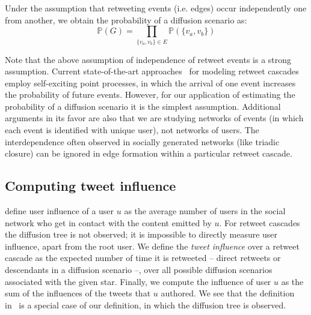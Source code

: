 Under the assumption that retweeting events (i.e. edges) occur independently one from another, we obtain the probability of a diffusion scenario as:
%
\begin{equation} \label{eq:prob-scenario}
	\mathds{P}(G) = \prod_{\{v_a,v_b\} \in E} \mathds{P}(\{v_a, v_b\})
\end{equation}

Note that the above assumption of independence of retweet events is a strong assumption.
Current state-of-the-art approaches~\cite{Mishra2016,Zhao2015} for modeling retweet cascades employ self-exciting point processes, in which the arrival of one event increases the probability of future events.
However, for our application of estimating the probability of a diffusion scenario it is the simplest assumption.
Additional arguments in its favor are also that we are studying networks of events
(in which each event is identified with unique user), not networks of users. 
The interdependence often observed in socially generated networks (like triadic closure)
can be ignored in edge formation within a particular retweet cascade. 

\subsection{Computing tweet influence}
\label{subsec:user-influence}

\cite{Du2013} define user influence of a user $u$ as the average number of users in the social network who get in contact with the content emitted by $u$.
For retweet cascades the diffusion tree is not observed; it is impossible to directly measure user influence, apart from the root user.
We define the \emph{tweet influence} over a retweet cascade as the expected number of time it is retweeted -- direct retweets or descendants in a diffusion scenario --, over all possible diffusion scenarios associated with the given star.
Finally, we compute the influence of user $u$ as the sum of the influences of the tweets that $u$ authored.
We see that the definition in~\cite{Du2013} is a special case of our definition, in which the diffusion tree is observed.

